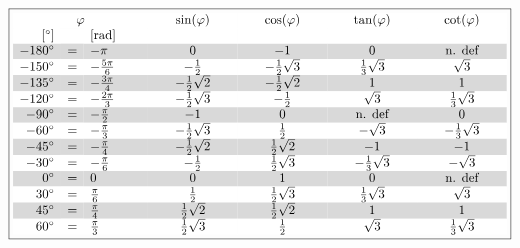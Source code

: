 \[ \boxed{\begin{array}{rclcccc}
\rowcolor{white} \multicolumn{3}{c}{\varphi}  &          \sin(\varphi)&          \cos(\varphi)&          \tan(\varphi)&          \cot(\varphi)\\
\rowcolor{white} \lbrack^\circ\rbrack & &\lbrack\text{rad}\rbrack\qquad&\qquad\qquad\qquad&\qquad\qquad\qquad&\qquad\qquad\qquad&\qquad\qquad\qquad\\
\rowcolor{lgray}-180^\circ&=&-\pi             &                      0&                     -1&                      0&          \text{n. def}\\
\rowcolor{white}-150^\circ&=&-\frac{5\pi}{6}  &           -\frac{1}{2}&   -\frac{1}{2}\sqrt{3}&    \frac{1}{3}\sqrt{3}&               \sqrt{3}\\
\rowcolor{lgray}-135^\circ&=&-\frac{3\pi}{4}  &   -\frac{1}{2}\sqrt{2}&   -\frac{1}{2}\sqrt{2}&                      1&                      1\\
\rowcolor{white}-120^\circ&=&-\frac{2\pi}{3}  &   -\frac{1}{2}\sqrt{3}&           -\frac{1}{2}&               \sqrt{3}&    \frac{1}{3}\sqrt{3}\\
\rowcolor{lgray} -90^\circ&=&-\frac{\pi}{2}   &                     -1&                      0&          \text{n. def}&                      0\\
\rowcolor{white} -60^\circ&=&-\frac{\pi}{3}   &   -\frac{1}{2}\sqrt{3}&            \frac{1}{2}&              -\sqrt{3}&   -\frac{1}{3}\sqrt{3}\\
\rowcolor{lgray} -45^\circ&=&-\frac{\pi}{4}   &   -\frac{1}{2}\sqrt{2}&    \frac{1}{2}\sqrt{2}&                     -1&                     -1\\
\rowcolor{white} -30^\circ&=&-\frac{\pi}{6}   &           -\frac{1}{2}&    \frac{1}{2}\sqrt{3}&   -\frac{1}{3}\sqrt{3}&              -\sqrt{3}\\
\rowcolor{lgray} 0^\circ  &=&0                &                      0&                      1&                      0&          \text{n. def}\\
\rowcolor{white} 30^\circ &=&\frac{\pi}{6}    &            \frac{1}{2}&    \frac{1}{2}\sqrt{3}&    \frac{1}{3}\sqrt{3}&               \sqrt{3}\\
\rowcolor{lgray} 45^\circ &=&\frac{\pi}{4}    &    \frac{1}{2}\sqrt{2}&    \frac{1}{2}\sqrt{2}&                      1&                      1\\
\rowcolor{white} 60^\circ &=&\frac{\pi}{3}    &    \frac{1}{2}\sqrt{3}&            \frac{1}{2}&               \sqrt{3}&    \frac{1}{3}\sqrt{3}\\

\end{array}}\]
